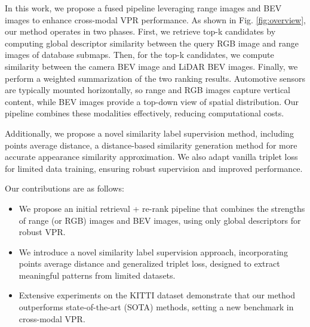 In this work, we propose a fused pipeline leveraging range images and BEV images to enhance cross-modal VPR performance. As shown in Fig. \ref{fig:overview}, our method operates in two phases. First, we retrieve top-k candidates by computing global descriptor similarity between the query RGB image and range images of database submaps. Then, for the top-k candidates, we compute similarity between the camera BEV image and LiDAR BEV images. Finally, we perform a weighted summarization of the two ranking results. Automotive sensors are typically mounted horizontally, so range and RGB images capture vertical content, while BEV images provide a top-down view of spatial distribution. Our pipeline combines these modalities effectively, reducing computational costs.

Additionally, we propose a novel similarity label supervision method, including points average distance, a distance-based similarity generation method for more accurate appearance similarity approximation. We also adapt vanilla triplet loss for limited data training, ensuring robust supervision and improved performance.

Our contributions are as follows:
\begin{itemize}
  \item We propose an initial retrieval + re-rank pipeline that combines the strengths of range (or RGB) images and BEV images, using only global descriptors for robust VPR.
  \item We introduce a novel similarity label supervision approach, incorporating points average distance and generalized triplet loss, designed to extract meaningful patterns from limited datasets.
  \item Extensive experiments on the KITTI dataset demonstrate that our method outperforms state-of-the-art (SOTA) methods, setting a new benchmark in cross-modal VPR.
\end{itemize}